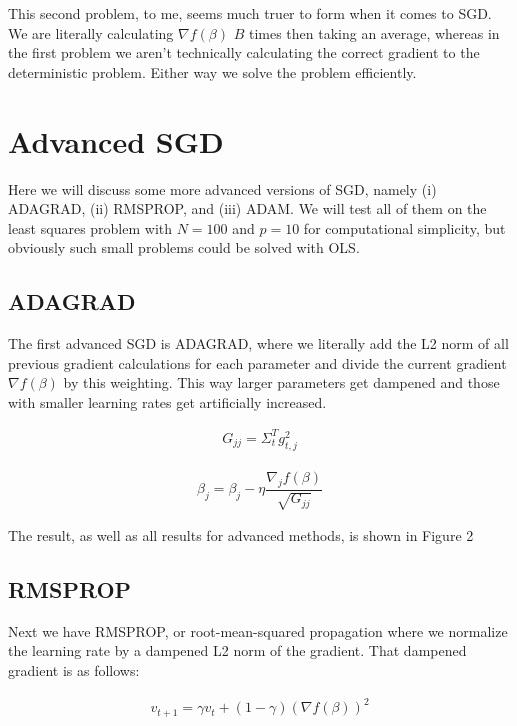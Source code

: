 \documentclass[12pt]{article}
\begin{document}
\vspace{5mm}

This second problem, to me, seems much truer to form when it comes to SGD. We are literally calculating $\nabla f(\beta)$ $B$ times then taking an average, whereas in the first problem we aren't technically calculating the correct gradient to the deterministic problem. Either way we solve the problem efficiently.

\section{Advanced SGD}

Here we will discuss some more advanced versions of SGD, namely (i) ADAGRAD, (ii) RMSPROP, and (iii) ADAM. We will test all of them on the least squares problem with $N=100$ and $p=10$ for computational simplicity, but obviously such small problems could be solved with OLS.

\subsection{ADAGRAD}

The first advanced SGD is ADAGRAD, where we literally add the L2 norm of all previous gradient calculations for each parameter and divide the current gradient $\nabla f(\beta)$ by this weighting. This way larger parameters get dampened and those with smaller learning rates get artificially increased.

\begin{align*}
G_{jj} = \Sigma_t^T g_{t,j}^2
\end{align*}

\begin{align*}
\beta_j = \beta_j - \eta \dfrac{\nabla_j f(\beta)}{\sqrt{G_{jj}}}
\end{align*}

\vspace{5mm}

The result, as well as all results for advanced methods, is shown in Figure 2

\subsection{RMSPROP}

Next we have RMSPROP, or root-mean-squared propagation where we normalize the learning rate by a dampened L2 norm of the gradient. That dampened gradient is as follows:

\begin{align*}
v_{t+1} = \gamma v_{t}+(1-\gamma) (\nabla f(\beta))^2
\end{align*}
\end{document}
